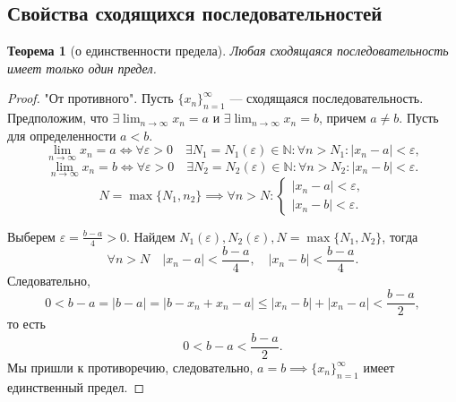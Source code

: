 \documentclass[a4paper,12pt]{article} %
\newtheorem{theorem}{Теорема}[subsection]
\theoremstyle{remark}
\begin{document}
\subsection{Свойства сходящихся последовательностей}
\begin{theorem}[о единственности предела]
	Любая сходящаяся последовательность имеет только один предел.	
\end{theorem}
\begin{proof}
	"От противного". Пусть $\{x_n\}_{n=1}^{\infty}$ --- сходящаяся последовательность. Предположим, что $\exists \lim_{n \to \infty} x_{n} = a$ и $\exists \lim_{n \to \infty} x_{n} = b$, причем $a\neq b$. Пусть для определенности $a<b$.
	\[
	\lim_{n \to \infty} x_{n} = a \iff \forall \varepsilon>0 \quad \exists N_1=N_1(\varepsilon)\in \mathbb{N} : \forall n>N_1 : |x_{n}-a|<\varepsilon
	,\] 
	\[
	\lim_{n \to \infty} x_{n} = b \iff \forall \varepsilon>0 \quad \exists N_2=N_2(\varepsilon)\in \mathbb{N} : \forall n>N_2 : |x_{n}-b|<\varepsilon
	.\] 
	\[
		N = \max\{N_1, n_2\} \implies \forall n>N : 
		\begin{cases}
			|x_{n}-a| < \varepsilon, \\
			|x_{n}-b| < \varepsilon.
		\end{cases}
	\] 
\begin{center}
\end{center}
Выберем $\varepsilon = \frac{b-a}{4} > 0$. Найдем $N_1(\varepsilon), N_2(\varepsilon), N=\max\{N_1, N_2\}$, тогда
\[
	\forall n>N \quad |x_{n}-a| < \frac{b-a}{4}, \quad |x_{n}-b| < \frac{b-a}{4}
.\] 
Следовательно,
\[
	0 < b-a = |b-a| = |b-x_{n}+x_{n}-a| \le |x_{n}-b|+|x_{n}-a| < \frac{b-a}{2}
,\] 
то есть
\[
0 < b-a < \frac{b-a}{2}
.\] 
Мы пришли к противоречию, следовательно, $a=b \implies \{x_n\}_{n=1}^{\infty}$ имеет единственный предел.
\end{proof}
\end{document}
